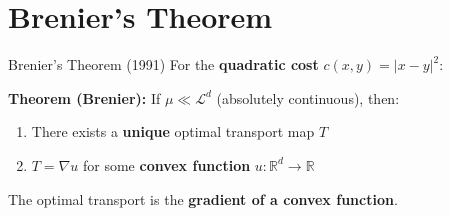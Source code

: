 \documentclass[aspectratio=169]{beamer}
\newcommand{\R}{\mathbb{R}}
\newcommand{\Ld}{\mathcal{L}^d}
\begin{document}
\section{Brenier's Theorem}

\begin{frame}{Brenier's Theorem (1991)}
For the \textbf{quadratic cost} $c(x,y) = |x-y|^2$:

\vspace{0.3cm}
\textbf{Theorem (Brenier):} If $\mu \ll \Ld$ (absolutely continuous), then:
\begin{enumerate}
    \item There exists a \textbf{unique} optimal transport map $T$
    \item $T = \nabla u$ for some \textbf{convex function} $u: \R^d \to \R$
\end{enumerate}

\vspace{0.3cm}
\begin{center}
\end{center}

\vspace{0.2cm}
The optimal transport is the \textbf{gradient of a convex function}.
\end{frame}
\end{document}
